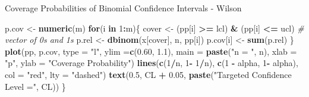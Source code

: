 \documentclass[
  ignorenonframetext,
]{beamer}
\newenvironment{Shaded}{\begin{snugshade}}{\end{snugshade}}
\newcommand{\AttributeTok}[1]{\textcolor[rgb]{0.13,0.29,0.53}{#1}}
\newcommand{\CommentTok}[1]{\textcolor[rgb]{0.56,0.35,0.01}{\textit{#1}}}
\newcommand{\ControlFlowTok}[1]{\textcolor[rgb]{0.13,0.29,0.53}{\textbf{#1}}}
\newcommand{\DecValTok}[1]{\textcolor[rgb]{0.00,0.00,0.81}{#1}}
\newcommand{\FloatTok}[1]{\textcolor[rgb]{0.00,0.00,0.81}{#1}}
\newcommand{\FunctionTok}[1]{\textcolor[rgb]{0.13,0.29,0.53}{\textbf{#1}}}
\newcommand{\NormalTok}[1]{#1}
\newcommand{\OtherTok}[1]{\textcolor[rgb]{0.56,0.35,0.01}{#1}}
\newcommand{\SpecialCharTok}[1]{\textcolor[rgb]{0.81,0.36,0.00}{\textbf{#1}}}
\newcommand{\StringTok}[1]{\textcolor[rgb]{0.31,0.60,0.02}{#1}}
\begin{document}
\begin{frame}[fragile]{Coverage Probabilities of Binomial Confidence
Intervals - Wilson}
\begin{Shaded}
\begin{Highlighting}[]
\NormalTok{p.cov }\OtherTok{\textless{}{-}} \FunctionTok{numeric}\NormalTok{(m)}
\ControlFlowTok{for}\NormalTok{(i }\ControlFlowTok{in} \DecValTok{1}\SpecialCharTok{:}\NormalTok{m)\{}
\NormalTok{  cover }\OtherTok{\textless{}{-}}\NormalTok{ (pp[i] }\SpecialCharTok{\textgreater{}=}\NormalTok{ lcl) }\SpecialCharTok{\&}\NormalTok{ (pp[i] }\SpecialCharTok{\textless{}=}\NormalTok{ ucl)  }\CommentTok{\# vector of 0s and 1s}
\NormalTok{  p.rel }\OtherTok{\textless{}{-}} \FunctionTok{dbinom}\NormalTok{(x[cover], n, pp[i])}
\NormalTok{  p.cov[i] }\OtherTok{\textless{}{-}} \FunctionTok{sum}\NormalTok{(p.rel)}
\NormalTok{\}}
\FunctionTok{plot}\NormalTok{(pp, p.cov, }\AttributeTok{type =} \StringTok{"l"}\NormalTok{, }\AttributeTok{ylim =}\FunctionTok{c}\NormalTok{(}\FloatTok{0.60}\NormalTok{, }\FloatTok{1.1}\NormalTok{), }\AttributeTok{main =} \FunctionTok{paste}\NormalTok{(}\StringTok{"n = "}\NormalTok{, n), }
     \AttributeTok{xlab =} \StringTok{"p"}\NormalTok{, }\AttributeTok{ylab =} \StringTok{"Coverage Probability"}\NormalTok{)}
\FunctionTok{lines}\NormalTok{(}\FunctionTok{c}\NormalTok{(}\DecValTok{1}\SpecialCharTok{/}\NormalTok{n, }\DecValTok{1}\SpecialCharTok{{-}} \DecValTok{1}\SpecialCharTok{/}\NormalTok{n), }\FunctionTok{c}\NormalTok{(}\DecValTok{1} \SpecialCharTok{{-}}\NormalTok{ alpha, }\DecValTok{1}\SpecialCharTok{{-}}\NormalTok{ alpha), }\AttributeTok{col =} \StringTok{"red"}\NormalTok{, }\AttributeTok{lty =} \StringTok{"dashed"}\NormalTok{)}
      \FunctionTok{text}\NormalTok{(}\FloatTok{0.5}\NormalTok{, CL }\SpecialCharTok{+} \FloatTok{0.05}\NormalTok{, }\FunctionTok{paste}\NormalTok{(}\StringTok{"Targeted Confidence Level ="}\NormalTok{, CL))}
\NormalTok{\}}
\end{Highlighting}
\end{Shaded}

\normalsize
\end{frame}
\end{document}
